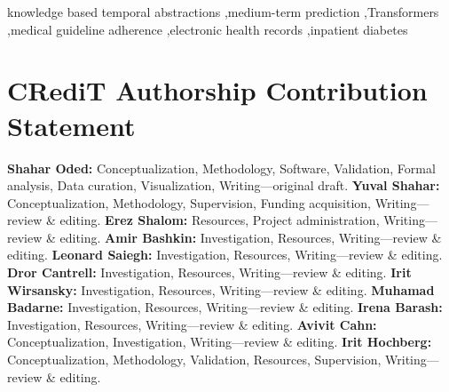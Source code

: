 \documentclass[preprint,12pt]{elsarticle}
\begin{document}
\begin{frontmatter}
\begin{abstract}
\textbf{Results.} The clinical interval encoder achieved a support-weighted area under the precision--recall curve of 0.527, with paired gains of 0.053 over the raw-observation STraTS model (95\% CI 0.036--0.070) and 0.075 over logistic regression. Within the shared encoder architecture, clinical intervals also outperformed statistically defined intervals (SAX; 0.467; paired difference 0.060, 95\% CI 0.046--0.076). The advantage persisted at daily cutoffs from two to six days, and the encoder retained discrimination at each hospital held out from training. Guideline assessment modestly improved prediction of hyperglycemia, while the overall difference across outcomes was uncertain (0.007, 95\% CI $-0.003$ to 0.018).

\textbf{Conclusion.} Clinical intervals improved discrimination over a model of individual observations in both intensive care and general inpatient records, with models fitted in each health system. In the Kineret dataset, a knowledge base developed for inpatient diabetes care made it possible to trace contributions to predicted risk back to clinical trends and patterns of care. The predictive value of guideline assessment varied by outcome.
\end{abstract}

\begin{keyword}
knowledge based temporal abstractions \sep medium-term prediction \sep Transformers
\sep medical guideline adherence \sep electronic health records \sep inpatient diabetes
\end{keyword}

\end{frontmatter}









\section*{CRediT Authorship Contribution Statement}
\textbf{Shahar Oded:} Conceptualization, Methodology, Software, Validation,
Formal analysis, Data curation, Visualization, Writing---original draft.
\textbf{Yuval Shahar:} Conceptualization, Methodology, Supervision, Funding
acquisition, Writing---review \& editing.
\textbf{Erez Shalom:} Resources, Project administration, Writing---review \&
editing.
\textbf{Amir Bashkin:} Investigation, Resources, Writing---review \& editing.
\textbf{Leonard Saiegh:} Investigation, Resources, Writing---review \& editing.
\textbf{Dror Cantrell:} Investigation, Resources, Writing---review \& editing.
\textbf{Irit Wirsansky:} Investigation, Resources, Writing---review \& editing.
\textbf{Muhamad Badarne:} Investigation, Resources, Writing---review \& editing.
\textbf{Irena Barash:} Investigation, Resources, Writing---review \& editing.
\textbf{Avivit Cahn:} Conceptualization, Investigation, Writing---review \&
editing.
\textbf{Irit Hochberg:} Conceptualization, Methodology, Validation,
Resources, Supervision, Writing---review \& editing.
\end{document}
